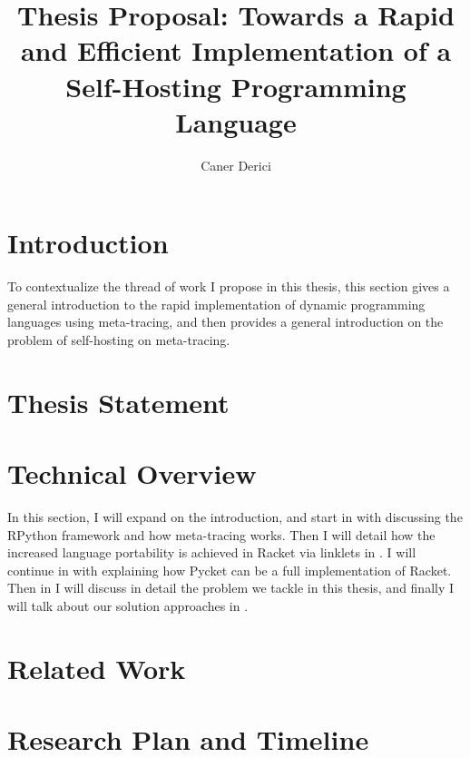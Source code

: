\documentclass[9pt]{extarticle}
\title{Thesis Proposal: Towards a Rapid and Efficient Implementation
  of a Self-Hosting Programming Language}
\author{Caner Derici}
\begin{document}


\maketitle

\begin{abstract}
\end{abstract}

\tableofcontents

\newpage

\section{Introduction}
\label{sec:intro}

To contextualize the thread of work I propose in this thesis, this
section gives a general introduction to the rapid implementation of
dynamic programming languages using meta-tracing, and then provides a
general introduction on the problem of self-hosting on meta-tracing.


\section{Thesis Statement}
\label{sec:thesis}


\section{Technical Overview}
\label{sec:technical}

In this section, I will expand on the introduction, and start in
 with discussing the RPython framework and how
meta-tracing works. Then I will detail how the increased language
portability is achieved in Racket via linklets in
. I will continue in 
with explaining how Pycket can be a full implementation of
Racket. Then in  I will discuss in detail
the problem we tackle in this thesis, and finally I will talk about
our solution approaches in .


\section{Related Work}
\label{sec:related}


\section{Research Plan and Timeline}
\label{sec:timeline}


\printbibliography
\end{document}
